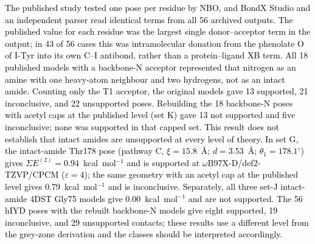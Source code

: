 \documentclass[journal=jcisd8,manuscript=article,layout=two-column]{achemso}
\newcommand{\tcb}[1]{{\textcolor{black}{#1}}}
\begin{document}
\tcb{The published study tested one pose per residue by NBO, and BondX Studio and an independent parser read identical terms from all 56 archived outputs. The published value for each residue was the largest single donor--acceptor term in the output; in 43 of 56 cases this was intramolecular donation from the phenolate O of I-Tyr into its own C--I antibond, rather than a protein--ligand XB term. All 18 published models with a backbone-N acceptor represented that nitrogen as an amine with one heavy-atom neighbour and two hydrogens, not as an intact amide. Counting only the T1 acceptor, the original models gave 13 supported, 21 inconclusive, and 22 unsupported poses. Rebuilding the 18 backbone-N poses with acetyl caps at the published level (set K) gave 13 not supported and five inconclusive; none was supported in that capped set. This result does not establish that intact amides are unsupported at every level of theory. In set G, the intact-amide Thr178 pose (pathway C, $\xi=15.8$~\AA{}; $d=3.53$~\AA{}; $\theta_1=178.1^\circ$) gives $\Sigma E^{(2)}=0.94$~kcal~mol$^{-1}$ and is supported at $\omega$B97X-D/def2-TZVP/CPCM ($\varepsilon=4$); the same geometry with an acetyl cap at the published level gives 0.79~kcal~mol$^{-1}$ and is inconclusive. Separately, all three set-J intact-amide 4DST Gly75 models give 0.00~kcal~mol$^{-1}$ and are not supported. The 56 hIYD poses with the rebuilt backbone-N models give eight supported, 19 inconclusive, and 29 unsupported contacts; these results use a different level from the grey-zone derivation and the classes should be interpreted accordingly.}
\end{document}
